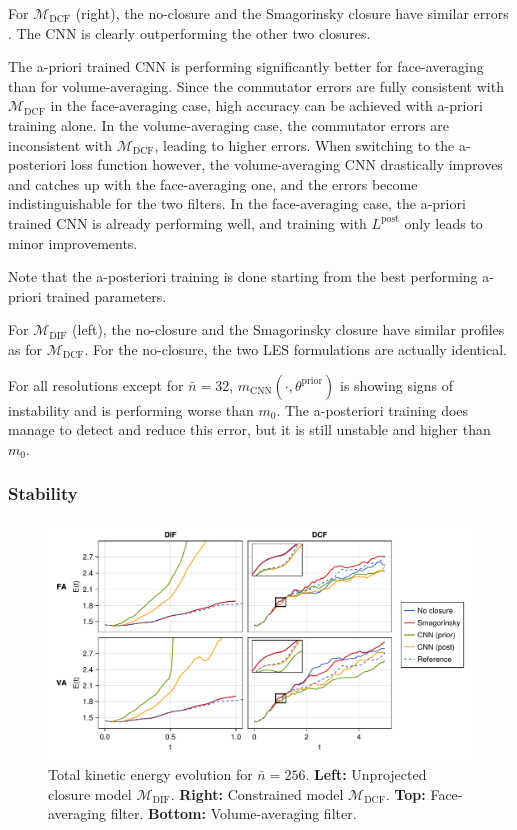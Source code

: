 \documentclass[preprint]{elsarticle}
\newcommand{\revboth}[1]{#1}
\begin{document}
For $\mathcal{M}_{\text{DCF}}$ (right), the no-closure and the Smagorinsky closure
have similar errors
\revboth{}.
The CNN is clearly outperforming the other two closures.
\revboth{
    
    The a-priori trained CNN is performing significantly better for
    face-averaging than for volume-averaging. Since the commutator errors
    are fully consistent with $\mathcal{M}_\text{DCF}$ in the face-averaging case,
    high accuracy can be achieved with a-priori training alone.
    In the volume-averaging case, the commutator errors are inconsistent
    with $\mathcal{M}_\text{DCF}$, leading to higher errors.
    When switching to the a-posteriori loss function however, the
    volume-averaging CNN drastically improves and catches up with the
    face-averaging one, and the errors become indistinguishable for the two
    filters.
    In the face-averaging case, the a-priori trained CNN is already performing
    well, and training with $L^\text{post}$ only leads to minor improvements.
}
Note that \revboth{ the a-posteriori} training is done starting from
the best performing a-priori trained parameters.

For $\mathcal{M}_{\text{DIF}}$ (left), the no-closure and the Smagorinsky closure have
similar profiles as for $\mathcal{M}_{\text{DCF}}$. For the no-closure, the two LES
formulations are actually identical.
\revboth{
    
    For all resolutions except for $\bar{n} = 32$,
    $m_\text{CNN}(\cdot, \theta^\text{prior})$ is showing signs
    of instability and is performing worse than $m_0$.
    The a-posteriori training does manage to detect and reduce this error, but
    it is still unstable and higher than $m_0$.
}

\subsubsection{Stability}

\begin{figure}
    \centering
    \includegraphics[width=\textwidth]{figures_kolmogorov_energy_evolution_nles=256.pdf}
    \caption{
        Total kinetic energy evolution for
        \revboth{ $\bar{n} = 256$}.
        \textbf{Left:} Unprojected closure model $\mathcal{M}_{\text{DIF}}$.
        \textbf{Right:} Constrained model $\mathcal{M}_{\text{DCF}}$.
        \textbf{Top:} Face-averaging filter.
        \textbf{Bottom:} Volume-averaging filter.
    }
    \label{fig:energy_evolution}
\end{figure}
\end{document}
